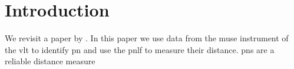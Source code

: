 

\chapter{Introduction}\label{sec:introduction}
We revisit a paper by \textcite{kreckel2017}. In this paper we use data from the \gls{muse} instrument of the \gls{vlt} to identify \gls{pn} and use the \gls{pnlf} to measure their distance. \Glspl{pn} are a reliable distance measure


